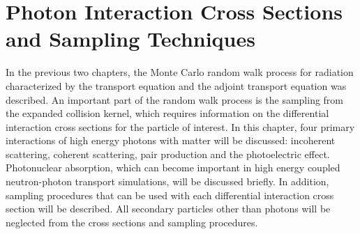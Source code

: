 \chapter{Photon Interaction Cross Sections and Sampling Techniques}
\label{ch:photon_interactions}
In the previous two chapters, the Monte Carlo random walk process for radiation 
characterized by the transport equation and the adjoint transport equation was 
described. An important part of the random walk process is the sampling from 
the expanded collision kernel, which requires information on the differential 
interaction cross sections for the particle of interest. In this chapter, four 
primary interactions of high energy photons with matter will be discussed: 
incoherent scattering, coherent scattering, pair production and the 
photoelectric effect. Photonuclear absorption, which can become important in 
high energy coupled neutron-photon transport simulations, will be discussed 
briefly. In addition, sampling procedures that can be used with each 
differential interaction cross section will be described. All secondary 
particles other than photons will be neglected from the cross sections and 
sampling procedures. 

